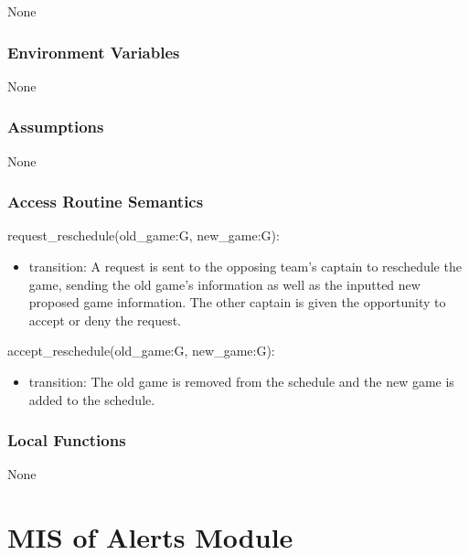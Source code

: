 \documentclass[12pt, titlepage]{article}
\begin{document}
None

\subsubsection{Environment Variables}

None

\subsubsection{Assumptions}


None

\subsubsection{Access Routine Semantics}

\noindent request\_reschedule(old\_game:G, new\_game:G):
\begin{itemize}
\item transition: A request is sent to the opposing team's captain to
      reschedule the game, sending the old game's information as well as the
      inputted new proposed game information. The other captain is given the
      opportunity to accept or deny the request.
\end{itemize}

\noindent accept\_reschedule(old\_game:G, new\_game:G):
\begin{itemize}
\item transition: The old game is removed from the schedule and the new game
      is added to the schedule.
\end{itemize}

\subsubsection{Local Functions}


None

\newpage

\section{MIS of Alerts Module} \label{mAL}
\end{document}
